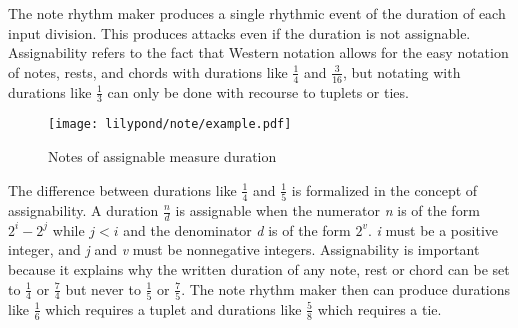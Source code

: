The note rhythm maker produces a single rhythmic event of the duration of each input division. This produces attacks even if the duration is not assignable. Assignability refers to the fact that Western notation allows for the easy notation of notes, rests, and chords with durations like $\frac{1}{4}$ and $\frac{3}{16}$, but notating with durations like $\frac{1}{3}$ can only be done with recourse to tuplets or ties.


\begin{figure}[H]
    \texttt{[image: lilypond/note/example.pdf]}
    \caption{Notes of assignable measure duration}
    \label{fig:note}
\end{figure}

The difference between durations like $\frac{1}{4}$ and $\frac{1}{5}$ is formalized in the concept of assignability. A duration $\frac{n}{d}$ is assignable when the numerator \textit{n} is of the form $2^i - 2^j$ while $j < i$ and the denominator \textit{d} is of the form $2^v$. \textit{i} must be a positive integer, and \textit{j} and \textit{v} must be nonnegative integers. Assignability is important because it explains why the written duration of any note, rest or chord can be set to $\frac{1}{4}$ or $\frac{7}{4}$ but never to $\frac{1}{5}$ or $\frac{7}{5}$. The note rhythm maker then can produce durations like $\frac{1}{6}$ which requires a tuplet and durations like $\frac{5}{8}$ which requires a tie.


